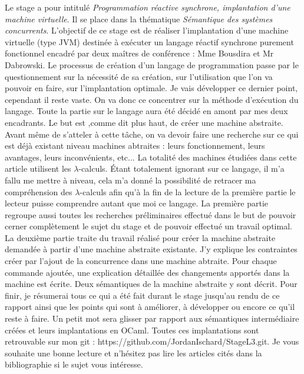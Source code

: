 \documentclass[10pt,a4paper]{article}
\begin{document}
		Le stage a pour intitulé \textit{Programmation réactive synchrone, implantation d’une machine virtuelle}. Il se place dans la thématique \textit{Sémantique des systèmes concurrents}. L’objectif de ce stage est de réaliser l’implantation d’une machine virtuelle (type JVM) destinée à exécuter un langage réactif synchrone purement fonctionnel encadré par deux maîtres de conférence : Mme Bousdira et Mr Dabrowski.
		\smallbreak
		Le processus de création d'un langage de programmation passe par le questionnement sur la nécessité de sa création, sur l'utilisation que l'on va pouvoir en faire, sur l'implantation optimale. Je vais développer ce dernier point, cependant il reste vaste. On va donc ce concentrer sur la méthode d'exécution du langage. Toute la partie sur le langage aura été décidé en amont par mes deux encadrants.
		\smallbreak
	    Le but est ,comme dit plus haut, de créer une machine abstraite. Avant même de s'atteler à cette tâche, on va devoir faire une recherche sur ce qui est déjà existant niveau machines abtraites : leurs fonctionnement, leurs avantages, leurs inconvénients, etc... La totalité des machines étudiées dans cette article utilisent les $\lambda$-calculs. Étant totalement ignorant sur ce langage, il m'a fallu me mettre à niveau, cela m'a donné la possibilité de retracer ma compréhension des $\lambda$-calculs afin qu'à la fin de la lecture de la première partie le lecteur puisse comprendre autant que moi ce langage. La première partie regroupe aussi toutes les recherches préliminaires effectué dans le but de pouvoir cerner complètement le sujet du stage et de pouvoir effectué un travail optimal.
		\smallbreak
		La deuxième partie traite du travail réalisé pour créer la machine abstraite demandée à partir d'une machine abstraite existante. J'y explique les contraintes créer par l'ajout de la concurrence dans une machine abtraite. Pour chaque commande ajoutée, une explication détaillée des changements apportés dans la machine est écrite. Deux sémantiques de la machine abstraite y sont décrit.
		\smallbreak
		Pour finir, je résumerai tous ce qui a été fait durant le stage jusqu'au rendu de ce rapport ainsi que les points qui sont à améliorer, à développer ou encore ce qu'il reste à faire. Un petit mot sera glisser par rapport aux sémantiques intermédiaire créées et leurs implantations en OCaml. Toutes ces implantations sont retrouvable sur mon git : https://github.com/JordanIschard/StageL3.git.
		\smallbreak
		Je vous souhaite une bonne lecture et n'hésitez pas lire les articles cités dans la bibliographie si le sujet vous intéresse.
		\newpage
		
\end{document}
